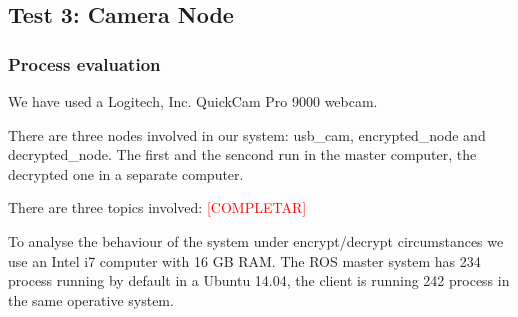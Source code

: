 \documentclass[journal,twoside]{JoPhA}
\begin{document}
% 
% 



\subsection{Test 3: Camera Node}


\subsubsection{Process evaluation}

We have used a Logitech, Inc. QuickCam Pro 9000 webcam.

There are three nodes involved in our system: usb\_cam, encrypted\_node and decrypted\_node. The first and the sencond run in the master computer, the decrypted one in a separate computer.

There are three topics involved: \textcolor{red}{[COMPLETAR]}

To analyse the behaviour of the system under encrypt/decrypt circumstances we use an Intel i7 computer with 16 GB RAM. The ROS master system has 234 process running by default in a Ubuntu 14.04, the client is running 242 process in the same operative system.
\end{document}

